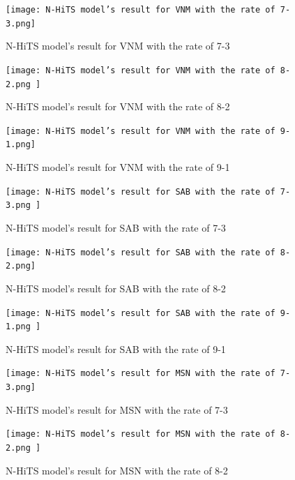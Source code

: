 \documentclass{ieeeojies}
\begin{document}
    \begin{figure}[H]
    \begin{minipage}{0.23\textwidth}
    \centering
    \texttt{[image: N-HiTS model’s result for VNM with the rate of 7-3.png]}
    \caption{N-HiTS model’s result for VNM with the rate of 7-3}
    \end{minipage}
    \hfill
    \begin{minipage}{0.23\textwidth}
    \centering
    \texttt{[image: N-HiTS model’s result for VNM with the rate of 8-2.png ]}
    \caption{N-HiTS model’s result for VNM with the rate of 8-2}
    \end{minipage}
    \end{figure}

    \begin{figure}[H]
    \begin{minipage}{0.23\textwidth}
    \centering
    \texttt{[image: N-HiTS model’s result for VNM with the rate of 9-1.png]}
    \caption{N-HiTS model’s result for VNM with the rate of 9-1}
    \end{minipage}
    \hfill
    \begin{minipage}{0.23\textwidth}
    \centering
    \texttt{[image: N-HiTS model’s result for SAB with the rate of 7-3.png ]}
    \caption{N-HiTS model’s result for SAB with the rate of 7-3}
    \end{minipage}
    \end{figure}

    \begin{figure}[H]
    \begin{minipage}{0.23\textwidth}
    \centering
    \texttt{[image: N-HiTS model’s result for SAB with the rate of 8-2.png]}
    \caption{N-HiTS model’s result for SAB with the rate of 8-2}
    \end{minipage}
    \hfill
    \begin{minipage}{0.23\textwidth}
    \centering
    \texttt{[image: N-HiTS model’s result for SAB with the rate of 9-1.png ]}
    \caption{N-HiTS model’s result for SAB with the rate of 9-1}
    \end{minipage}
    \end{figure}

    \begin{figure}[H]
    \begin{minipage}{0.23\textwidth}
    \centering
    \texttt{[image: N-HiTS model’s result for MSN with the rate of 7-3.png]}
    \caption{N-HiTS model’s result for MSN with the rate of 7-3}
    \end{minipage}
    \hfill
    \begin{minipage}{0.23\textwidth}
    \centering
    \texttt{[image: N-HiTS model’s result for MSN with the rate of 8-2.png ]}
    \caption{N-HiTS model’s result for MSN with the rate of 8-2}
    \end{minipage}
    \end{figure}
\end{document}

